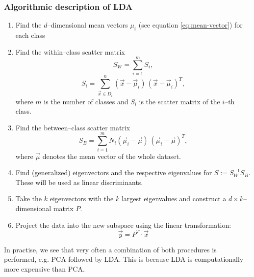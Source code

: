 \subsubsection{Algorithmic description of LDA}
\begin{enumerate}
\item Find the $d$--dimensional mean vectors $\mu_i$ (see equation \eqref{eq:mean-vector}) for each class
\item Find the within--class scatter matrix
\begin{equation}
S_W = \sum_{i = 1}^m S_i,
\end{equation}
\begin{equation}
S_i = \sum_{\vec x \in D_i}^n (\vec x - \vec \mu_i) \, (\vec x - \vec \mu_i)^T,
\end{equation}
where $m$ is the number of classes and $S_i$ is the scatter matrix of the $i$--th class.
\item Find the between--class scatter matrix
\begin{equation}
S_B = \sum_{i = 1}^m N_i (\vec \mu_i - \vec \mu) \, (\vec \mu_i - \vec \mu)^T,
\end{equation}
where $\vec \mu$ denotes the mean vector of the whole dataset.
\item Find (generalized) eigenvectors and the respective eigenvalues for $S := S_W^{-1} S_B$. These will be used as linear discriminants.
\item Take the $k$ eigenvectors with the $k$ largest eigenvalues and construct a $d \times k$--dimensional matrix $P$.
\item Project the data into the new subspace using the linear transformation:
\begin{equation}
\vec y = P^T \cdot \vec x
\end{equation}
\end{enumerate}

In practise, we see that very often a combination of both procedures is performed, e.g. PCA followed by LDA. This is because LDA is computationally more expensive than PCA.
